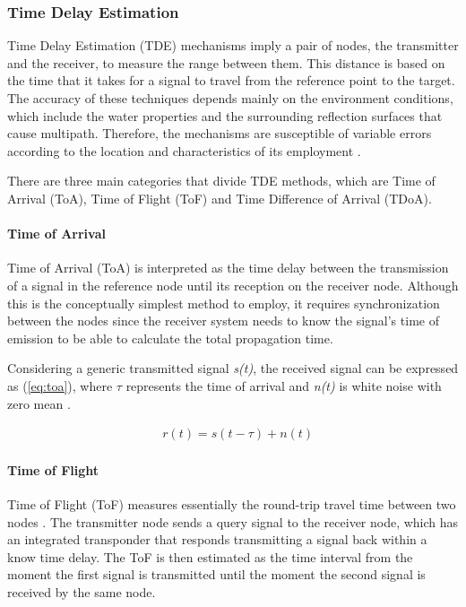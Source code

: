 \subsubsection{Time Delay Estimation}
Time Delay Estimation (TDE) mechanisms imply a pair of nodes, the transmitter and the receiver, to measure the range between them. This distance is based on the time that it takes for a signal to travel from the reference point to the target. The accuracy of these techniques depends mainly on the environment conditions, which include the water properties and the surrounding reflection surfaces that cause multipath. Therefore, the mechanisms are susceptible of variable errors according to the location and characteristics of its employment \cite{und-localiz-survey}.

There are three main categories that divide TDE methods, which are Time of Arrival (ToA), Time of Flight (ToF) and  Time Difference of Arrival (TDoA).

\paragraph{Time of Arrival}

Time of Arrival (ToA) is interpreted as the time delay between the transmission of a signal in the reference node until its reception on the receiver node. Although this is the conceptually simplest method to employ, it requires synchronization between the nodes since the receiver system needs to know the signal's time of emission to be able to calculate the total propagation time.

Considering a generic transmitted signal \textit{s(t)}, the received signal can be expressed as (\ref{eq:toa}), where $\tau$ represents the time of arrival and \textit{n(t)} is white noise with zero mean \cite{wirelesscomm}. 

\begin{eqnarray}
& r(t) = s(t - \tau) + n(t)
\label{eq:toa}
\end{eqnarray}

\paragraph{Time of Flight}

Time of Flight (ToF) measures essentially the round-trip travel time between two nodes \cite{und-localiz-survey}. The transmitter node sends a query signal to the receiver node, which has an integrated transponder that responds transmitting a signal back within a know time delay. The ToF is then estimated as the time interval from the moment the first signal is transmitted until the moment the second signal is received by the same node. 

